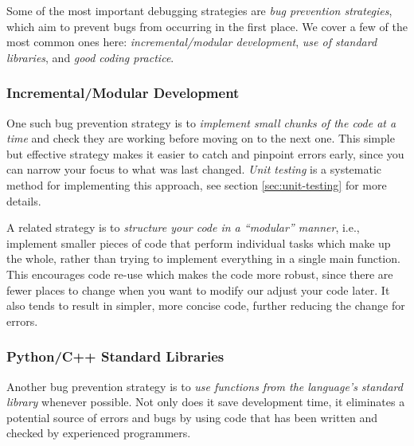 \documentclass[12pt]{article}
\begin{document}
Some of the most important debugging strategies are \emph{bug prevention strategies}, which aim to prevent bugs from occurring in the first place. We cover a few of the most common ones here: \emph{incremental/modular development}, \emph{use of standard libraries}, and \emph{good coding practice}.

\subsubsection{Incremental/Modular Development}
One such bug prevention strategy is to \emph{implement small chunks of the code at a time} and check they are working before moving on to the next one. This simple but effective strategy makes it easier to catch and pinpoint errors early, since you can narrow your focus to what was last changed. \emph{Unit testing} is a systematic method for implementing this approach, see section \ref{sec:unit-testing} for more details.

A related strategy is to \emph{structure your code in a ``modular'' manner}, i.e., implement smaller pieces of code that perform individual tasks which make up the whole, rather than trying to implement everything in a single main function.  This encourages code re-use which makes the code more robust, since there are fewer places to change when you want to modify our adjust your code later. It also tends to result in simpler, more concise code, further reducing the change for errors.

\subsubsection{Python/C++ Standard Libraries}
Another bug prevention strategy is to \emph{use functions from the language's standard library} whenever possible. Not only does it save development time, it eliminates a potential source of errors and bugs by using code that has been written and checked by experienced programmers.
\end{document}
